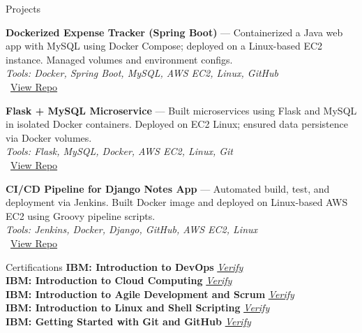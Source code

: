 \documentclass{resume}
\begin{document}
\begin{rSection}{Projects}
\item \textbf{Dockerized Expense Tracker (Spring Boot)} — Containerized a Java web app with MySQL using Docker Compose; deployed on a Linux-based EC2 instance. Managed volumes and environment configs. \\
{\small \textit{Tools: Docker, Spring Boot, MySQL, AWS EC2, Linux, GitHub}} \\
\faGithub~\href{https://github.com/SufiyanKhanCloud/docker-practice/tree/main/Expenses-Tracker-WebApp}{View Repo}

\item \textbf{Flask + MySQL Microservice} — Built microservices using Flask and MySQL in isolated Docker containers. Deployed on EC2 Linux; ensured data persistence via Docker volumes. \\
{\small \textit{Tools: Flask, MySQL, Docker, AWS EC2, Linux, Git}} \\
\faGithub~\href{https://github.com/SufiyanKhanCloud/docker-practice/tree/main/two-tier-flask-app}{View Repo}

\item \textbf{CI/CD Pipeline for Django Notes App} — Automated build, test, and deployment via Jenkins. Built Docker image and deployed on Linux-based AWS EC2 using Groovy pipeline scripts. \\
{\small \textit{Tools: Jenkins, Docker, Django, GitHub, AWS EC2, Linux}} \\
\faGithub~\href{https://github.com/SufiyanKhanCloud/Django-Notes-App}{View Repo}
\end{rSection}


\begin{rSection}{Certifications}
\textbf{IBM: Introduction to DevOps} \hfill \href{https://www.coursera.org/account/accomplishments/verify/OIGBYO6L8GZJ}{\textit{Verify}} \\
\textbf{IBM: Introduction to Cloud Computing} \hfill \href{https://www.coursera.org/account/accomplishments/verify/O4EN4P7ZI6XV}{\textit{Verify}} \\
\textbf{IBM: Introduction to Agile Development and Scrum} \hfill \href{https://www.coursera.org/account/accomplishments/verify/PV26WR8KH5MX}{\textit{Verify}} \\
\textbf{IBM: Introduction to Linux and Shell Scripting} \hfill \href{https://www.coursera.org/account/accomplishments/verify/07JX8O7ZPDCY}{\textit{Verify}} \\
\textbf{IBM: Getting Started with Git and GitHub} \hfill \href{https://www.coursera.org/account/accomplishments/verify/6JZJJTDRFPBT}{\textit{Verify}}
\end{rSection}
\end{document}
